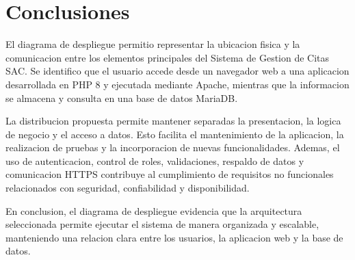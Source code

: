 \documentclass[12pt,letterpaper]{article}
\begin{document}
\section{Conclusiones}

El diagrama de despliegue permitio representar la ubicacion fisica y la comunicacion entre los elementos principales del Sistema de Gestion de Citas SAC. Se identifico que el usuario accede desde un navegador web a una aplicacion desarrollada en PHP 8 y ejecutada mediante Apache, mientras que la informacion se almacena y consulta en una base de datos MariaDB.

La distribucion propuesta permite mantener separadas la presentacion, la logica de negocio y el acceso a datos. Esto facilita el mantenimiento de la aplicacion, la realizacion de pruebas y la incorporacion de nuevas funcionalidades. Ademas, el uso de autenticacion, control de roles, validaciones, respaldo de datos y comunicacion HTTPS contribuye al cumplimiento de requisitos no funcionales relacionados con seguridad, confiabilidad y disponibilidad.

En conclusion, el diagrama de despliegue evidencia que la arquitectura seleccionada permite ejecutar el sistema de manera organizada y escalable, manteniendo una relacion clara entre los usuarios, la aplicacion web y la base de datos.
\end{document}
